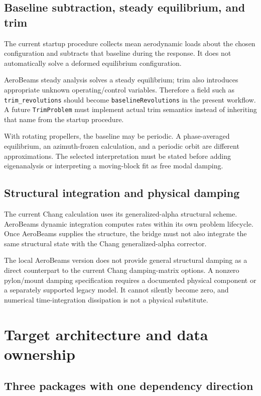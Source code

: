 \documentclass[11pt,a4paper]{article}
\newcommand{\code}{\nolinkurl}
\begin{document}
\subsection{Baseline subtraction, steady equilibrium, and trim}

The current startup procedure collects mean aerodynamic loads about the
chosen configuration and subtracts that baseline during the response. It
does not automatically solve a deformed equilibrium configuration.

AeroBeams steady analysis solves a steady equilibrium; trim also introduces
appropriate unknown operating/control variables. Therefore a field such as
\code{trim_revolutions} should become \code{baselineRevolutions} in the
present workflow. A future \code{TrimProblem} must implement actual trim
semantics instead of inheriting that name from the startup procedure.

With rotating propellers, the baseline may be periodic. A phase-averaged
equilibrium, an azimuth-frozen calculation, and a periodic orbit are different
approximations. The selected interpretation must be stated before adding
eigenanalysis or interpreting a moving-block fit as free modal damping.

\subsection{Structural integration and physical damping}

The current Chang calculation uses its generalized-alpha structural scheme.
AeroBeams dynamic integration computes rates within its own problem lifecycle.
Once AeroBeams supplies the structure, the bridge must not also integrate the
same structural state with the Chang generalized-alpha corrector.

The local AeroBeams version does not provide general structural damping as
a direct counterpart to the current Chang damping-matrix options. A nonzero
pylon/mount damping specification requires a documented physical component
or a separately supported legacy model. It cannot silently become zero, and
numerical time-integration dissipation is not a physical substitute.

\section{Target architecture and data ownership}
\label{sec:architecture}

\subsection{Three packages with one dependency direction}
\end{document}
